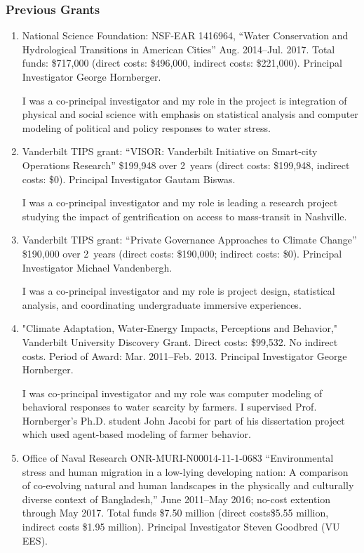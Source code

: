 \subsubsection{Previous Grants}
\begin{enumerate}
    \item National Science Foundation: NSF-EAR 1416964, ``Water Conservation and Hydrological Transitions in American Cities'' Aug. 2014--Jul. 2017. Total funds: \$717,000 (direct costs: \$496,000, indirect costs: \$221,000). Principal Investigator George Hornberger.
    \begin{credit}
    I was a co-principal investigator and my role in the project is integration of physical and social science with emphasis on statistical analysis and computer modeling of political and policy responses to water stress.
    \end{credit}
    \item Vanderbilt TIPS grant: ``VISOR: Vanderbilt Initiative on Smart-city Operations Research'' \$199,948 over 2~years (direct costs: \$199,948, indirect costs: \$0). Principal Investigator Gautam Biswas.
    \begin{credit}
	I was a co-principal investigator and my role is leading a research project studying the impact of gentrification on access to mass-transit in Nashville.
    \end{credit}
    \item Vanderbilt TIPS grant: ``Private Governance Approaches to Climate Change'' \$190,000 over 2~years (direct costs: \$190,000; indirect costs: \$0). Principal Investigator Michael Vandenbergh.
    \begin{credit}
    I was a co-principal investigator and my role is project design, statistical analysis, and coordinating undergraduate immersive experiences.
    \end{credit}
	\item "Climate Adaptation, Water-Energy Impacts, Perceptions and Behavior," Vanderbilt University Discovery Grant. Direct costs: \$99,532. No indirect costs. Period of Award: Mar. 2011--Feb. 2013. Principal Investigator George Hornberger.
	\begin{credit}
	I was co-principal investigator and my role was computer modeling of behavioral responses to water scarcity by farmers. I supervised Prof. Hornberger's Ph.D. student John Jacobi for part of his dissertation project which used agent-based modeling of farmer behavior.
	\end{credit}
	\item Office of Naval Research ONR-MURI-N00014-11-1-0683 ``Environmental stress and human migration in a low-lying developing nation: A comparison of co-evolving natural and human landscapes in the physically and culturally diverse context of Bangladesh,'' June 2011--May 2016; no-cost extention through May 2017. Total funds \$7.50 million (direct costs\$5.55 million, indirect costs \$1.95 million). Principal Investigator Steven Goodbred (VU EES).

\end{enumerate}
